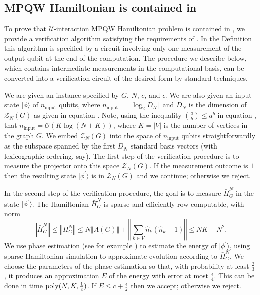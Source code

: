 \documentclass[../thesis-main/thesis-main]{subfiles}
\begin{document}
\subsection{MPQW Hamiltonian is contained in \QMA}
\label{sec:containment_in_QMA}

To prove that $\mathcal{U}$-interaction MPQW Hamiltonian problem is contained in \QMA, we provide a verification algorithm satisfying the requirements of . In the Definition this algorithm is specified by a circuit involving only one measurement of the output qubit at the end of the computation. The procedure we describe below, which contains intermediate measurements in the computational basis, can be converted into a verification circuit of the desired form by standard techniques.

We are given an instance specified by $G$, $N$, $c$, and $\epsilon$. We are also given an input state $|\phi\rangle$ of $n_{\text{input}}$ qubits, where $n_{\text{input}}=\lceil \log_{2}D_{N}\rceil $ and $D_{N}$ is the dimension of $\mathcal{Z}_{N}(G)$ as given in equation . Note, using the inequality $\binom{a}{b} \leq a^{b}$ in equation , that $n_{\text{input}}=\mathcal{O}(K\log\left(N+K\right))$, where $K=|V|$ is the number of vertices in the graph $G$. We embed $\mathcal{Z}_{N}(G)$ into the space of $n_{\text{input}}$ qubits straightforwardly as the subspace spanned by the first $D_{N}$ standard basis vectors (with lexicographic ordering, say). The first step of the verification procedure is to measure the projector onto this space $\mathcal{Z}_{N}(G)$. If the measurement outcome is $1$ then the resulting state $|\phi^{\prime}\rangle$ is in $\mathcal{Z}_{N}(G)$ and we continue; otherwise we reject.

In the second step of the verification procedure, the goal is to measure $\bar{H}_{G}^{N}$ in the state $|\phi^{\prime}\rangle$. The Hamiltonian $\bar{H}_{G}^{N}$ is sparse and efficiently row-computable, with norm
\begin{equation}
\left\Vert \bar{H}_{G}^{N}\right\Vert \leq\left\Vert H_{G}^{N}\right\Vert \leq N\left\Vert A(G)\right\Vert +\left\Vert \sum_{k\in V}\hat{n}_{k}\left(\hat{n}_{k}-1\right)\right\Vert \leq NK+N^{2}.
\end{equation}
We use phase estimation (see for example \cite{CEMM98}) to estimate the energy of $|\phi^{\prime}\rangle$, using sparse Hamiltonian simulation \cite{AT03} to approximate evolution according to $\bar{H}_{G}^{N}$. We choose the parameters of the phase estimation so that, with probability at least $\frac{2}{3}$, it produces an approximation $E$ of the energy with error at most $\frac{\epsilon}{4}$. This can be done in time $\operatorname{poly}(N,K,\frac{1}{\epsilon})$. If $E\leq c+\frac{\epsilon}{2}$ then we accept; otherwise we reject.
\end{document}
